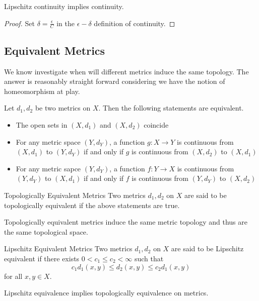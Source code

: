 \documentclass[a4paper]{article}
\begin{document}
\begin{lmm}{}{} Lipschitz continuity implies continuity. \tcbline
\begin{proof}
Set $\delta=\frac{\epsilon}{C}$ in the $\epsilon-\delta$ definition of continuity. 
\end{proof}
\end{lmm}

\subsection{Equivalent Metrics}
We know investigate when will different metrics induce the same topology. The answer is reasonably straight forward considering we have the notion of homeomorphism at play. 

\begin{thm}{}{} Let $d_1,d_2$ be two metrics on $X$. Then the following statements are equivalent. 
\begin{itemize}
\item The open sets in $(X,d_1)$ and $(X,d_2)$ coincide
\item For any metric space $(Y,d_Y)$, a function $g:X\to Y$ is continuous from $(X,d_1)$ to $(Y,d_Y)$ if and only if $g$ is continuous from $(X,d_2)$ to $(X,d_1)$
\item For any metric sapce $(Y,d_Y)$, a function $f:Y\to X$ is continuous from $(Y,d_Y)$ to $(X,d_1)$ if and only if $f$ is continuous from $(Y,d_Y)$ to $(X,d_2)$
\end{itemize}
\end{thm}

\begin{defn}{Topologically Equivalent Metrics}{} Two metrics $d_1,d_2$ on $X$ are said to be topologically equivalent if the above statements are true. 
\end{defn}

\begin{lmm}{}{} Topologically equivalent metrics induce the same metric topology and thus are the same topological space. 
\end{lmm}

\begin{defn}{Lipschitz Equivalent Metrics}{} Two metrics $d_1,d_2$ on $X$ are said to be Lipschitz equivalent if there exists $0<c_1\leq c_2<\infty$ such that $$c_1d_1(x,y)\leq d_2(x,y)\leq c_2d_1(x,y)$$ for all $x,y\in X$. 
\end{defn}

\begin{lmm}{}{} Lipschitz equivalence implies topologically equivalence on metrics. 
\end{lmm}
\end{document}
